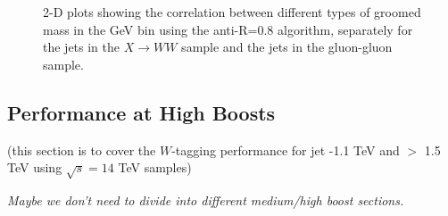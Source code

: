 \begin{figure}
\begin{center}
\caption{2-D plots showing the correlation between different types of
  groomed mass in the  GeV bin using the anti-\kT R=0.8
  algorithm, separately for the jets in the $X \rightarrow WW$ sample and the
  jets in the gluon-gluon sample.}
\label{fig:pt500_2d_massGG_AKt_R08}
\end{center}
\end{figure}


\subsection{Performance at High Boosts}

(this section is to cover the $W$-tagging performance for jet -1.1 TeV and
$>$ 1.5 TeV using $\sqrt{s} = 14$ TeV samples)

{\it Maybe we don't need to divide into different medium/high boost sections.}





